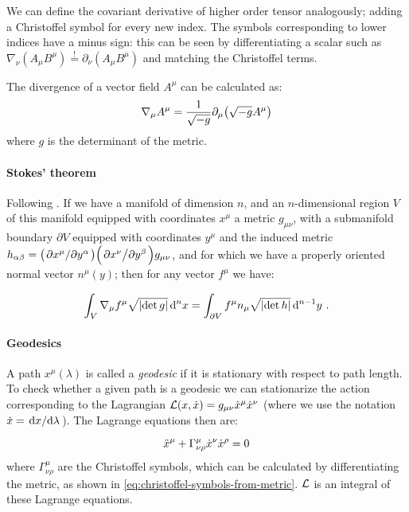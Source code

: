 \documentclass[main.tex]{subfiles}
\begin{document}
We can define the covariant derivative of higher order tensor analogously; adding a Christoffel symbol for every new index. The symbols corresponding to lower indices have a minus sign: this can be seen by differentiating a scalar such as \(\nabla_\nu (A_\mu B^\mu) \overset{!}{=}  \partial_\nu (A_\mu B^\mu)\) and matching the Christoffel terms.

The divergence of a vector field $A^\mu$ can be calculated as:
\begin{equation}
    \nabla_\mu A^\mu = \frac{1}{\sqrt{-g}}\partial_\mu \qty(\sqrt{-g}A^\mu) \label{eq:covariant-divergence}
\end{equation}
where $g$ is the determinant of the metric.

\paragraph{Stokes' theorem}

Following \cite[]{Unger:2016}.
If we have a manifold of dimension \(n\), and an \(n\)-dimensional region \(V\) of this manifold equipped with coordinates \(x^\mu\) a metric \(g_{\mu\nu}\), with a submanifold boundary \(\partial V\) equipped with coordinates \(y^\mu\) and the induced metric \(h_{\alpha\beta} = \qty(\pdv*{x^\mu}{y^\alpha}) \qty(\pdv*{x^\nu}{y^\beta}) g_{\mu\nu}\), and for which we have a properly oriented normal vector \(n^\mu (y)\); then for any vector \(f^\mu\) we have:

\begin{equation} \label{eq:stokes-theorem}
    \int _{V} \nabla_\mu f^\mu \sqrt{\abs{\det g}}  \dd[n]{x}  = \int _{\partial V} f^\mu  n_\mu \sqrt{\abs{\det h}} \dd[n-1]{y} \,.
\end{equation}

\paragraph{Geodesics}

A path $x^\mu(\lambda)$ is called a \emph{geodesic} if it is stationary with respect to path length.
To check whether a given path is a geodesic we can stationarize the action corresponding to the Lagrangian $\mathcal{L} (x, \Dot{x}) = g_{\mu\nu} \Dot{x}^\mu \Dot{x}^\nu$ (where we use the notation $\Dot{x} = \dv*{x}{\lambda}$). The Lagrange equations then are:

\begin{equation}
    \Ddot{x}^\mu + \Gamma^\mu_{\nu\rho} \Dot{x}^\nu \Dot{x}^\rho = 0
\end{equation}
where $\Gamma^\mu_{\nu \rho}$ are the Christoffel symbols, which can be calculated by differentiating the metric, as shown in \eqref{eq:christoffel-symbols-from-metric}. $\mathcal{L}$ is an integral of these Lagrange equations.
\end{document}
